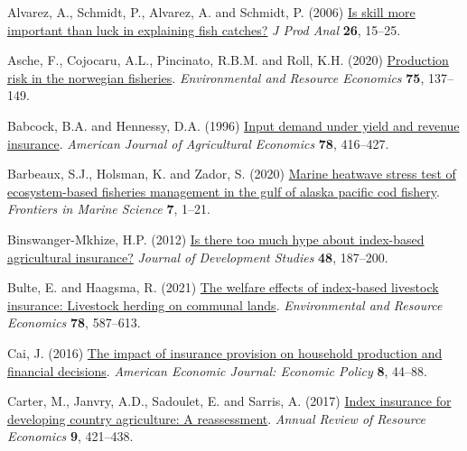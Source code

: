 \documentclass[
  letterpaper,
  DIV=11,
  numbers=noendperiod]{scrartcl}
\newlength{\cslhangindent}
\newlength{\cslentryspacingunit} %
\newenvironment{CSLReferences}[2] %
 {%
  \setlength{\parindent}{0pt}
  \ifodd #1
  \let\oldpar\par
  \def\par{\hangindent=\cslhangindent\oldpar}
  \fi
  \setlength{\parskip}{#2\cslentryspacingunit}
 }%
 {}
\theoremstyle{plain}
\theoremstyle{plain}
\theoremstyle{remark}
\begin{document}
\hypertarget{refs}{}
\begin{CSLReferences}{1}{0}
\leavevmode{}%
Alvarez, A., Schmidt, P., Alvarez, A. and Schmidt, P. (2006)
\href{https://doi.org/10.1007/s11123-006-0002-x}{Is skill more important
than luck in explaining fish catches?} \emph{J Prod Anal} \textbf{26},
15--25.

\leavevmode{}%
Asche, F., Cojocaru, A.L., Pincinato, R.B.M. and Roll, K.H. (2020)
\href{https://doi.org/10.1007/s10640-019-00391-2}{Production risk in the
norwegian fisheries}. \emph{Environmental and Resource Economics}
\textbf{75}, 137--149.

\leavevmode{}%
Babcock, B.A. and Hennessy, D.A. (1996)
\href{https://doi.org/10.2307/1243713}{Input demand under yield and
revenue insurance}. \emph{American Journal of Agricultural Economics}
\textbf{78}, 416--427.

\leavevmode{}%
Barbeaux, S.J., Holsman, K. and Zador, S. (2020)
\href{https://doi.org/10.3389/fmars.2020.00703}{Marine heatwave stress
test of ecosystem-based fisheries management in the gulf of alaska
pacific cod fishery}. \emph{Frontiers in Marine Science} \textbf{7},
1--21.

\leavevmode{}%
Binswanger-Mkhize, H.P. (2012)
\href{https://doi.org/10.1080/00220388.2011.625411}{Is there too much
hype about index-based agricultural insurance?} \emph{Journal of
Development Studies} \textbf{48}, 187--200.

\leavevmode{}%
Bulte, E. and Haagsma, R. (2021)
\href{https://doi.org/10.1007/s10640-021-00545-1}{The welfare effects of
index-based livestock insurance: Livestock herding on communal lands}.
\emph{Environmental and Resource Economics} \textbf{78}, 587--613.

\leavevmode{}%
Cai, J. (2016) \href{https://doi.org/10.1257/pol.20130371}{The impact of
insurance provision on household production and financial decisions}.
\emph{American Economic Journal: Economic Policy} \textbf{8}, 44--88.

\leavevmode{}%
Carter, M., Janvry, A.D., Sadoulet, E. and Sarris, A. (2017)
\href{https://doi.org/10.1146/annurev-resource-100516-053352}{Index
insurance for developing country agriculture: A reassessment}.
\emph{Annual Review of Resource Economics} \textbf{9}, 421--438.


\end{CSLReferences}
\end{document}
